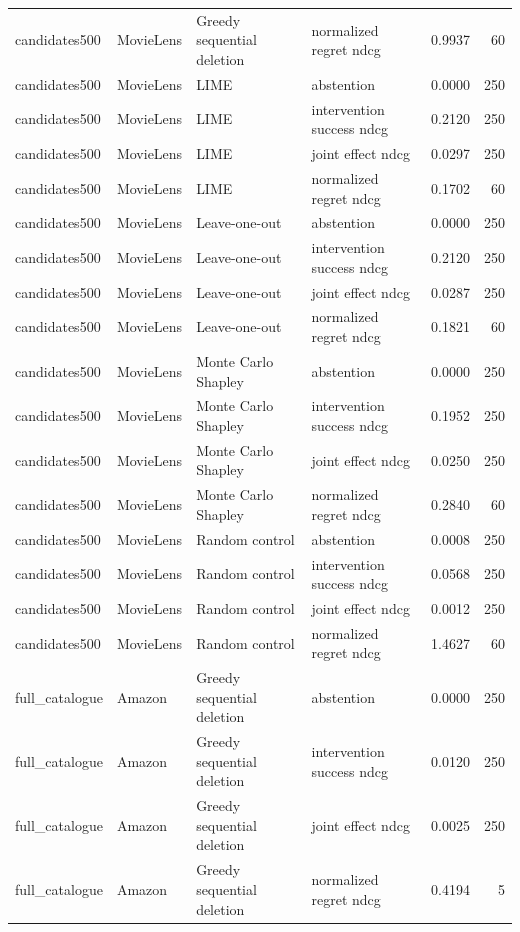 \begin{longtable}{@{}p{.16\linewidth}p{.11\linewidth}p{.15\linewidth}p{.22\linewidth}rr@{}}
candidates500 & MovieLens & Greedy sequential deletion & normalized regret ndcg & 0.9937 & 60 \\
candidates500 & MovieLens & LIME & abstention & 0.0000 & 250 \\
candidates500 & MovieLens & LIME & intervention success ndcg & 0.2120 & 250 \\
candidates500 & MovieLens & LIME & joint effect ndcg & 0.0297 & 250 \\
candidates500 & MovieLens & LIME & normalized regret ndcg & 0.1702 & 60 \\
candidates500 & MovieLens & Leave-one-out & abstention & 0.0000 & 250 \\
candidates500 & MovieLens & Leave-one-out & intervention success ndcg & 0.2120 & 250 \\
candidates500 & MovieLens & Leave-one-out & joint effect ndcg & 0.0287 & 250 \\
candidates500 & MovieLens & Leave-one-out & normalized regret ndcg & 0.1821 & 60 \\
candidates500 & MovieLens & Monte Carlo Shapley & abstention & 0.0000 & 250 \\
candidates500 & MovieLens & Monte Carlo Shapley & intervention success ndcg & 0.1952 & 250 \\
candidates500 & MovieLens & Monte Carlo Shapley & joint effect ndcg & 0.0250 & 250 \\
candidates500 & MovieLens & Monte Carlo Shapley & normalized regret ndcg & 0.2840 & 60 \\
candidates500 & MovieLens & Random control & abstention & 0.0008 & 250 \\
candidates500 & MovieLens & Random control & intervention success ndcg & 0.0568 & 250 \\
candidates500 & MovieLens & Random control & joint effect ndcg & 0.0012 & 250 \\
candidates500 & MovieLens & Random control & normalized regret ndcg & 1.4627 & 60 \\
full\_catalogue & Amazon & Greedy sequential deletion & abstention & 0.0000 & 250 \\
full\_catalogue & Amazon & Greedy sequential deletion & intervention success ndcg & 0.0120 & 250 \\
full\_catalogue & Amazon & Greedy sequential deletion & joint effect ndcg & 0.0025 & 250 \\
full\_catalogue & Amazon & Greedy sequential deletion & normalized regret ndcg & 0.4194 & 5 \\

\end{longtable}
